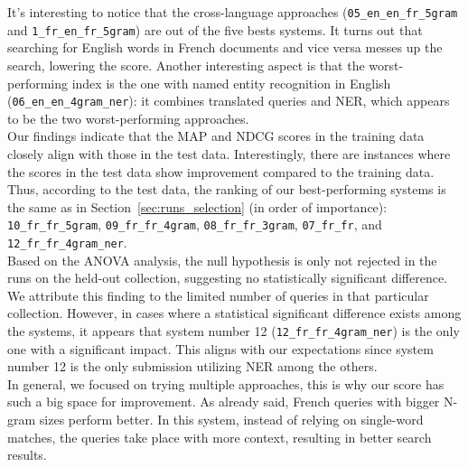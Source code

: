 It's interesting to notice that the cross-language approaches (\texttt{05\_en\_en\_fr\_5gram} and
\texttt{1\_fr\_en\_fr\_5gram}) are out of the five bests systems.
It turns out that searching for English words in French documents and vice versa messes up the search, lowering the
score.
Another interesting aspect is that the worst-performing index is the one with named entity recognition in English
(\texttt{06\_en\_en\_4gram\_ner}): it combines translated queries and NER, which appears to be the two worst-performing
approaches.\\

Our findings indicate that the MAP and NDCG scores in the training data closely align with those in the test data.
Interestingly, there are instances where the scores in the test data show improvement compared to the training data.
Thus, according to the test data, the ranking of our best-performing systems is the same as in
Section~\ref{sec:runs_selection} (in order of importance): \texttt{10\_fr\_fr\_5gram},
\texttt{09\_fr\_fr\_4gram}, \texttt{08\_fr\_fr\_3gram}, \texttt{07\_fr\_fr}, and \texttt{12\_fr\_fr\_4gram\_ner}.\\

Based on the ANOVA analysis, the null hypothesis is only not rejected in the runs on the held-out collection, suggesting
no statistically significant difference.
We attribute this finding to the limited number of queries in that particular collection.
However, in cases where a statistical significant difference exists among the systems, it appears that system number 12
(\texttt{12\_fr\_fr\_4gram\_ner}) is the only one with a significant impact.
This aligns with our expectations since system number 12 is the only submission utilizing NER among the others.\\

In general, we focused on trying multiple approaches, this is why our score has such a big space for improvement.
As already said, French queries with bigger N-gram sizes perform better.
In this system, instead of relying on single-word matches, the queries take place with more context, resulting in better
search results.\\